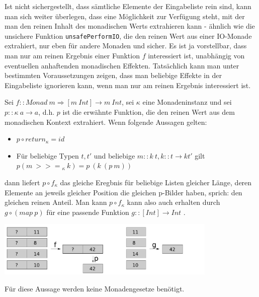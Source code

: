 \documentclass[11pt]{article} %
\begin{document}
Ist nicht sichergestellt, dass sämtliche Elemente der Eingabeliste rein sind, kann man sich weiter überlegen, dass eine
Möglichkeit zur Verfügung steht, mit der man den reinen Inhalt des monadischen Werts extrahieren kann - ähnlich wie
die unsichere Funktion \texttt{unsafePerformIO}, die den reinen Wert aus einer IO-Monade extrahiert, nur eben für
andere Monaden und sicher.
Es ist ja vorstellbar, dass man nur am reinen Ergebnis einer Funktion $f$ interessiert ist, unabhängig von eventuellen anhaftenden
monadischen Effekten. Tatsächlich kann man unter bestimmten Voraussetzungen zeigen, dass man beliebige Effekte in der 
Eingabeliste ignorieren kann, wenn man nur am reinen Ergebnis interessiert ist.

Sei $f :: Monad\ m \Rightarrow [m\ Int] \rightarrow m\ Int$, sei $\kappa$ eine Monadeninstanz und sei $p :: \kappa\ a \rightarrow a$, d.h. $p$ ist die erwähnte Funktion, die den reinen Wert aus dem monadischen Kontext extrahiert.
Wenn folgende Aussagen gelten:

\begin{itemize}
\item $p \circ return_{\kappa} = id$
\item Für beliebige Typen $t, t'$ und beliebige $m :: k\ t, k :: t \rightarrow k t'$ gilt\\
$p (m\ {>>=}_{\kappa}\ k) = p\ (k\ (p\ m))$
\end{itemize}

dann liefert $p \circ f_{\kappa}$ das gleiche Eregbnis für beliebige Listen gleicher Länge, deren Elemente an jeweils gleicher Position
die gleichen p-Bilder haben, sprich: den gleichen reinen Anteil. Man kann $p \circ f_{\kappa}$ kann also auch erhalten durch
$g \circ (map\ p)$ für eine passende Funktion $g :: [Int] \rightarrow Int$ \cite{voigtlander}.

\includegraphics[height=100px]{safe-value-extraction}

Für diese Aussage werden keine Monadengesetze benötigt.

\newpage

\end{document}
